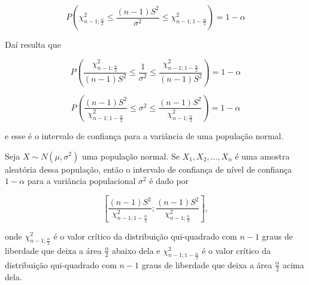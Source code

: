 \documentclass[
]{book}
\begin{document}
\[P\left(\chi^2_{n-1;\frac{\alpha}{2}}\leq \frac{(n-1)S^2}{\sigma^2} \leq \chi^2_{n-1;1-\frac{\alpha}{2}}\right)=1-\alpha\]

Daí resulta que

\[P\left(\frac{\chi^2_{n-1;\frac{\alpha}{2}}}{(n-1)S^2}\leq \frac{1}{\sigma^2} \leq \frac{\chi^2_{n-1;1-\frac{\alpha}{2}}}{(n-1)S^2}\right)=1-\alpha\]

\[P\left(\frac{(n-1)S^2}{\chi^2_{n-1;1-\frac{\alpha}{2}}}\leq \sigma^2 \leq \frac{(n-1)S^2}{\chi^2_{n-1;\frac{\alpha}{2}}}\right)=1-\alpha\]

e esse é o intervalo de confiança para a variância de uma população normal.

Seja \(X\sim N(\mu,\sigma^2)\) uma população normal. Se \(X_1,X_2,\ldots,X_n\) é uma amostra aleatória dessa população, então o intervalo de confiança de nível de confiança \(1-\alpha\) para a variância populacional \(\sigma^2\) é dado por

\[\left[\frac{(n-1)S^2}{\chi^2_{n-1;1-\frac{\alpha}{2}}};\frac{(n-1)S^2}{\chi^2_{n-1;\frac{\alpha}{2}}}\right],\]

onde \(\chi^2_{n-1;\frac{\alpha}{2}}\) é o valor crítico da distribuição qui-quadrado com \(n-1\) graus de liberdade que deixa a área \(\frac{\alpha}{2}\) abaixo dela e \(\chi^2_{n-1;1-\frac{\alpha}{2}}\) é o valor crítico da distribuição qui-quadrado com \(n-1\) graus de liberdade que deixa a área \(\frac{\alpha}{2}\) acima dela.

  
\end{document}
